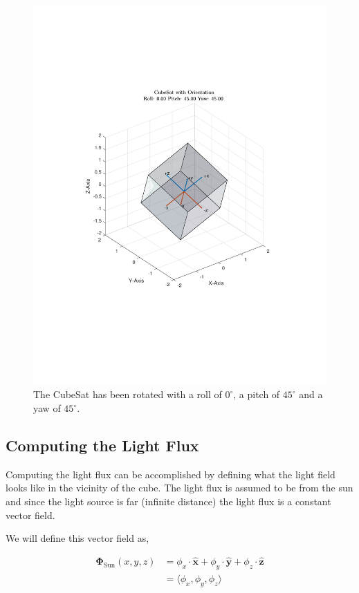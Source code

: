 \documentclass[10pt, letterpaper]{article}
\begin{document}
\begin{figure}[H]
	\centering
	\includegraphics[scale=0.8]{RotatedCubeSat.pdf}
    \caption{The CubeSat has been rotated with a roll of $0^{\circ}$, a pitch of $45^{\circ}$ and a yaw of $45^{\circ}$. }
    \label{fig:RotatedCubeSat}
\end{figure}

\subsection{Computing the Light Flux}

Computing the light flux can be accomplished by defining what the light field looks like in the vicinity of the cube. The light flux is assumed to be from the sun and since the light source is far (infinite distance) the light flux is a constant vector field.

We will define this vector field as,

\begin{align*}
    \mathbf{\Phi}_{\text{Sun}}(x, y, z) &= \phi_{x} \cdot \mathbf{\hat{x}} + \phi_{y} \cdot \mathbf{\hat{y}} + \phi_{z} \cdot \mathbf{\hat{z}} \\
    &= \langle \phi_{x}, \phi_{y}, \phi_{z} \rangle
\end{align*}
\end{document}
